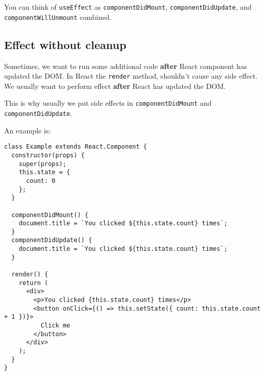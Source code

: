 You can think of \texttt{useEffect} as \texttt{componentDidMount}, \texttt{componentDidUpdate},
and \texttt{componentWillUnmount} combined. 

\subsection{Effect without cleanup}

Sometimes, we want to run some additional code \textbf{after} React component
has updated the DOM. 
In React the \texttt{render} method, shouldn't cause any side effect. We usually
want to perform effect \textbf{after} React has updated the DOM. 

This is why usually we put side effects in \texttt{componentDidMount} and 
\texttt{componentDidUpdate}. 

An example is:

\begin{lstlisting}
class Example extends React.Component {
  constructor(props) {
    super(props);
    this.state = {
      count: 0
    };
  }

  componentDidMount() {
    document.title = `You clicked ${this.state.count} times`;
  }
  componentDidUpdate() {
    document.title = `You clicked ${this.state.count} times`;
  }

  render() {
    return (
      <div>
        <p>You clicked {this.state.count} times</p>
        <button onClick={() => this.setState({ count: this.state.count + 1 })}>
          Click me
        </button>
      </div>
    );
  }
}
\end{lstlisting}

